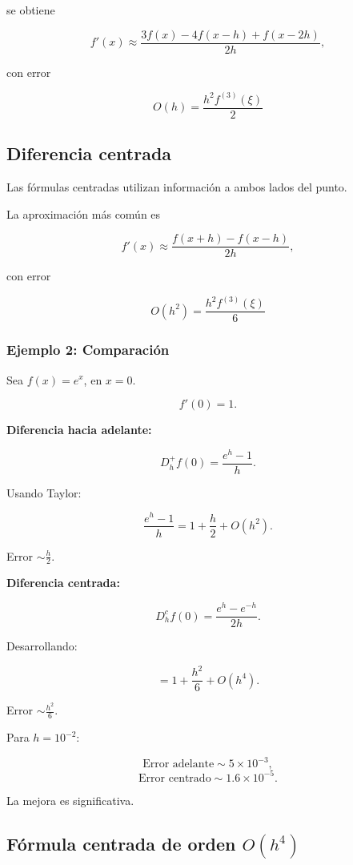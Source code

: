 \documentclass[12pt,a4paper]{article}
\theoremstyle{definition}
\theoremstyle{remark}
\begin{document}
se obtiene

\[
f'(x) \approx
\frac{3f(x)-4f(x-h)+f(x-2h)}{2h},
\]

con error

\[
O(h)= \frac{h^2 f^{(3)}(\xi)}{2}
\]




\subsection{Diferencia centrada}

Las fórmulas centradas utilizan información a ambos lados del punto.

La aproximación más común es

\[
f'(x) \approx
\frac{f(x+h)-f(x-h)}{2h},
\]

con error


\[
O(h^2)= \frac{h^2 f^{(3)}(\xi)}{6}
\]




\subsubsection*{Ejemplo 2: Comparación}

Sea $f(x)=e^x$, en $x=0$.

\[
f'(0)=1.
\]

\textbf{Diferencia hacia adelante:}

\[
D_h^+ f(0)=\frac{e^h-1}{h}.
\]

Usando Taylor:

\[
\frac{e^h-1}{h}
=
1 + \frac{h}{2} + O(h^2).
\]

Error $\sim \frac{h}{2}$.

\bigskip

\textbf{Diferencia centrada:}

\[
D_h^c f(0)=\frac{e^h-e^{-h}}{2h}.
\]

Desarrollando:

\[
=
1 + \frac{h^2}{6} + O(h^4).
\]

Error $\sim \frac{h^2}{6}$.

\bigskip

Para $h=10^{-2}$:

\[
\text{Error adelante} \sim 5\times 10^{-3},
\]
\[
\text{Error centrado} \sim 1.6\times 10^{-5}.
\]

La mejora es significativa.

\subsection{Fórmula centrada de orden $O(h^4)$}
\end{document}
